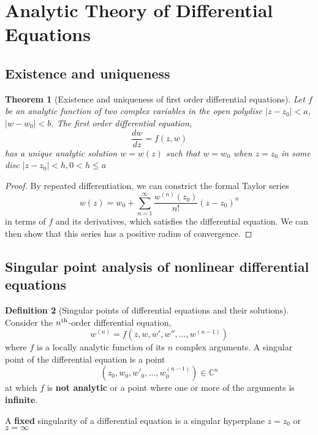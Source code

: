 \documentclass[10pt, oneside, reqno]{amsart}
\theoremstyle{plain}%
\newtheorem{thm}{Theorem}[section]
\theoremstyle{definition}
\newtheorem{defn}[thm]{Definition}
\theoremstyle{remark}
\newcommand{\Com}{\mathbb{C}}
\newcommand{\nth}{n\textsuperscript{th}}
\begin{document}


\section{Analytic Theory of Differential Equations} %
\label{cha:analytic_theory_of_differential_equations}



\subsection{Existence and uniqueness} %
\label{sec:existence_and_uniqueness}


\begin{thm}[Existence and uniqueness of first order differential equations]
    Let $f$ be an analytic function of two complex variables in the open polydisc $|z - z_0| < a$, $|w - w_0| < b$.
    The first order differential equation,
    \[
        \frac{dw}{dz} = f(z,w)
    \] has a unique analytic solution $w = w(z)$ such that $w = w_0$ when $ z = z_0$ in some disc $|z - z_0| < h, 0 < h \leq a$
\end{thm}

\begin{proof}
    By repeated differentiation, we can constrict the formal Taylor series \[
        w(z) = w_0 + \sum_{n=1}^\infty \frac{w^{(n)}(z_0)}{n!} (z - z_0)^n
    \] in terms of $f$ and its derivatives, which satisfies the differential equation.  We can then show that this series has a positive radius of convergence.
\end{proof}


\subsection{Singular point analysis of nonlinear differential equations} %
\label{sec:singular_point_analysis_of_nonlinear_differential_equations}

\begin{defn}[Singular points of differential equations and their solutions]
    Consider the $\nth$-order differential equation,\[
        w^{(n)} = f(z, w, w', w'', \dots, w^{(n-1)})
    \] where $f$ is a locally analytic function of its $n$ complex arguments.  A singular point of the differential equation is a point \[
        (z_0, w_0, w'_0, \dots, w_0^{(n-1)}) \in \Com^n
    \]
    at which $f$ is \textbf{not analytic} or a point where one or more of the arguments is \textbf{infinite}.
    
    A \textbf{fixed} singularity of a differential equation is a singular hyperplane $z = z_0$ or $z = \infty$
\end{defn}
\end{document}
